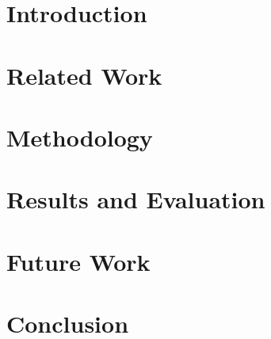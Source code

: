 \documentclass[a4paper,12pt]{report}
\begin{document}
\cleardoublepage
{}
\setcounter{page}{1}

\chapter{Introduction}


\chapter{Related Work}


\chapter{Methodology}


\chapter{Results and Evaluation}


\chapter{Future Work}


\chapter{Conclusion}


\printbibliography[heading=bibintoc, title={References}]
\end{document}
